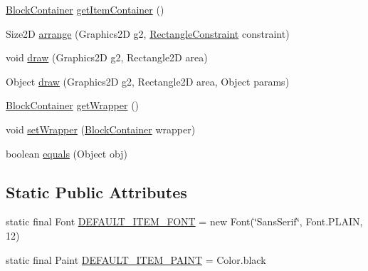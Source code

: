 \begin{DoxyCompactItemize}
\item 
\mbox{\hyperlink{classorg_1_1jfree_1_1chart_1_1block_1_1_block_container}{Block\+Container}} \mbox{\hyperlink{classorg_1_1jfree_1_1chart_1_1title_1_1_legend_title_a52f9e756bcaf0d94e67b6f5c59298200}{get\+Item\+Container}} ()
\item 
Size2D \mbox{\hyperlink{classorg_1_1jfree_1_1chart_1_1title_1_1_legend_title_a2495bc37b4b9f15e00280185d2de63f4}{arrange}} (Graphics2D g2, \mbox{\hyperlink{classorg_1_1jfree_1_1chart_1_1block_1_1_rectangle_constraint}{Rectangle\+Constraint}} constraint)
\item 
void \mbox{\hyperlink{classorg_1_1jfree_1_1chart_1_1title_1_1_legend_title_a4df683b4d81fb14c8b769f394612c154}{draw}} (Graphics2D g2, Rectangle2D area)
\item 
Object \mbox{\hyperlink{classorg_1_1jfree_1_1chart_1_1title_1_1_legend_title_a006fb515a2acc72597f9355efc99d1c9}{draw}} (Graphics2D g2, Rectangle2D area, Object params)
\item 
\mbox{\hyperlink{classorg_1_1jfree_1_1chart_1_1block_1_1_block_container}{Block\+Container}} \mbox{\hyperlink{classorg_1_1jfree_1_1chart_1_1title_1_1_legend_title_a526c82877fdb5a1dd842e012434ee418}{get\+Wrapper}} ()
\item 
void \mbox{\hyperlink{classorg_1_1jfree_1_1chart_1_1title_1_1_legend_title_a3608509ef0d36246385350e3b1587034}{set\+Wrapper}} (\mbox{\hyperlink{classorg_1_1jfree_1_1chart_1_1block_1_1_block_container}{Block\+Container}} wrapper)
\item 
boolean \mbox{\hyperlink{classorg_1_1jfree_1_1chart_1_1title_1_1_legend_title_aba45d9264a35e5f1ce215515e0c45f13}{equals}} (Object obj)
\end{DoxyCompactItemize}
\subsection*{Static Public Attributes}
\begin{DoxyCompactItemize}
\item 
static final Font \mbox{\hyperlink{classorg_1_1jfree_1_1chart_1_1title_1_1_legend_title_a2e49133aa4859032877432cd2cdc5945}{D\+E\+F\+A\+U\+L\+T\+\_\+\+I\+T\+E\+M\+\_\+\+F\+O\+NT}} = new Font(\char`\"{}Sans\+Serif\char`\"{}, Font.\+P\+L\+A\+IN, 12)
\item 
static final Paint \mbox{\hyperlink{classorg_1_1jfree_1_1chart_1_1title_1_1_legend_title_a127a638b8305f34e21c99862a7b0c06d}{D\+E\+F\+A\+U\+L\+T\+\_\+\+I\+T\+E\+M\+\_\+\+P\+A\+I\+NT}} = Color.\+black
\end{DoxyCompactItemize}
